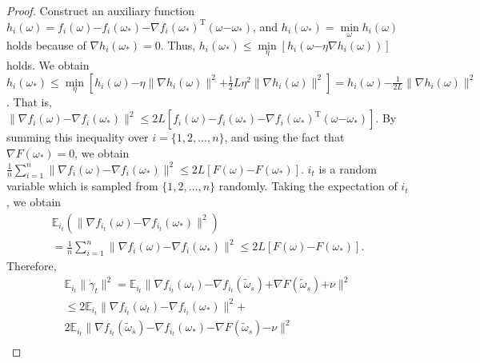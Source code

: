\documentclass[letterpaper]{article}
\begin{document}
\begin{proof}
Construct an auxiliary function $h_i(\omega)=f_i(\omega)\mathrm{-}f_i(\omega_\ast)\mathrm{-}\nabla f_i(\omega_\ast)^\mathrm{T}(\omega\mathrm{-}\omega_\ast)$, and $h_i(\omega_\ast)=\min\limits_\omega h_i(\omega)$ holds because of $\nabla h_i(\omega_\ast)=0$. Thus, $h_i(\omega_\ast)\le \min\limits_\eta [h_i(\omega\mathrm{-}\eta \nabla h_i(\omega))]$ holds. We obtain
$h_i(\omega_\ast)\le\min\limits_\eta [h_i(\omega)\mathrm{-}\eta \parallel \nabla h_i(\omega) \parallel^2\mathrm{+}\frac{1}{2} L \eta^2 \parallel  \nabla h_i(\omega)  \parallel^2  ] 
=h_i(\omega)\mathrm{-}\frac{1}{2L}\parallel  \nabla h_i(\omega) \parallel^2$.  That is, 
$\parallel   \nabla f_i(\omega)  \mathrm{-} \nabla f_i(\omega_\ast)   \parallel^2 \le 2L [ f_i(\omega)  \mathrm{-}  f_i(\omega_\ast)  \mathrm{-}\nabla f_i(\omega_\ast)^{\mathrm{T}}(\omega\mathrm{-}\omega_\ast)  ]$. By summing this inequality over $i=\{1,2, ..., n\}$, and using the fact that $\nabla F(\omega_\ast)=0$, we obtain $
\frac{1}{n} \sum\limits_{i=1}^n \parallel  \nabla f_i(\omega)  \mathrm{-} \nabla f_i(\omega_\ast)  \parallel^2  \mathrm{\le}   2L [F(\omega)\mathrm{-}F(\omega_\ast)] $. $i_t$ is a random variable which is sampled from $\{1,2, ...,n\}$ randomly. Taking the expectation of $i_t$, we obtain 
\begin{equation}\label{equa_1}
\begin{array}{ll}
\mathbb{E}_{i_t}(\parallel  \nabla f_{i_{t}}(\omega) \mathrm{-} \nabla f_{i_{t}}(\omega_{\ast}) \parallel^2) \\
= \frac{1}{n} \sum\limits_{i=1}^n \parallel  \nabla f_i(\omega) \mathrm{-} \nabla f_i(\omega_\ast)  \parallel^2 \le 2L [F(\omega)\mathrm{-}F(\omega_\ast)].
\end{array} 
\end{equation}  Therefore,
\begin{equation}\label{equa_2}
\begin{array}{ll}
\mathbb{E}_{i_t}\parallel  \dot{\gamma}_{t} \parallel^2  
= \mathbb{E}_{i_t} \parallel \nabla f_{i_{t}}(\omega_{t}) \mathrm{-} \nabla f_{i_{t}}(\tilde{\omega}_s)  \mathrm{+} \nabla F(\tilde{\omega}_s) \mathrm{+} \nu \parallel^2\\
\le 2\mathbb{E}_{i_t} \parallel \nabla f_{i_{t}}(\omega_{t}) \mathrm{-} \nabla f_{i_{t}}(\omega_{\ast}) \parallel^2 \mathrm{+}\\
 2 \mathbb{E}_{i_t} \parallel  \nabla f_{i_{t}}(\tilde{\omega}_{s}) \mathrm{-} \nabla f_{i_{t}}(\omega_{\ast}) \mathrm{-} \nabla F(\tilde{\omega}_s)   \mathrm{-} \nu  \parallel^2  \\

\end{array}
\end{equation}
\end{proof}
\end{document}

